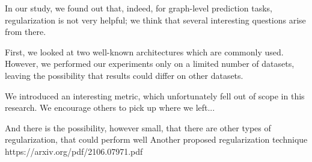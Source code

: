 In our study, we found out that, indeed, for graph-level prediction tasks, regularization is not very helpful; we think that several interesting questions arise from there.

First, we looked at two well-known architectures which are commonly used.
However, we performed our experiments only on a limited number of datasets, leaving the possibility that results could differ on other datasets.

We introduced an interesting metric, which unfortunately fell out of scope in this research.
We encourage others to pick up where we left...



And there is the possibility, however small, that there are other types of regularization, that could perform well
Another proposed regularization technique
https://arxiv.org/pdf/2106.07971.pdf